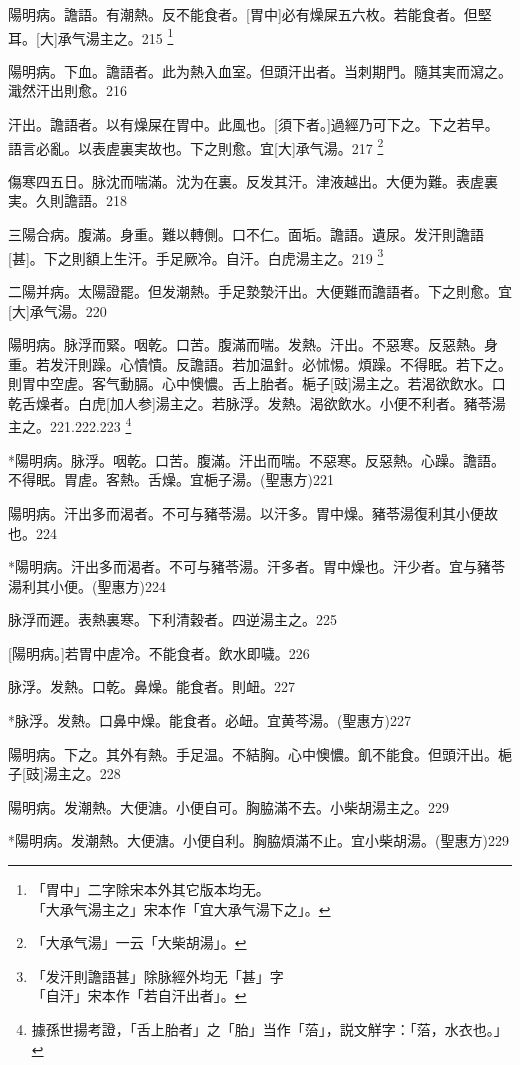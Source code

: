 \documentclass[12pt,twoside,UTF8,b5paper]{ctexbook}
\begin{document}
陽明病。譫語。有潮熱。反不能食者。[胃中]必有燥屎五六枚。若能食者。但堅耳。[大]承气湯主之。215
	\footnote{「胃中」二字除宋本外其它版本均无。\\「大承气湯主之」宋本作「宜大承气湯下之」。}

陽明病。下血。譫語者。此为熱入血室。但頭汗出者。当刺期門。隨其実而瀉之。濈然汗出則愈。216

汗出。譫語者。以有燥屎在胃中。此風也。[須下者。]過經乃可下之。下之若早。語言必亂。以表虗裏実故也。下之則愈。宜[大]承气湯。217
	\footnote{「大承气湯」一云「大柴胡湯」。}

傷寒四五日。脉沈而喘滿。沈为在裏。反发其汗。津液越出。大便为難。表虗裏実。久則譫語。218

三陽合病。腹滿。身重。難以轉側。口不仁。面垢。譫語。遺尿。发汗則譫語[甚]。下之則額上生汗。手足厥冷。自汗。白虎湯主之。219
	\footnote{「发汗則譫語甚」除脉經外均无「甚」字\\「自汗」宋本作「若自汗出者」。}

二陽并病。太陽證罷。但发潮熱。手足漐漐汗出。大便難而譫語者。下之則愈。宜[大]承气湯。220

陽明病。脉浮而緊。咽乾。口苦。腹滿而喘。发熱。汗出。不惡寒。反惡熱。身重。若发汗則躁。心憒憒。反譫語。若加温針。必怵惕。煩躁。不得眠。若下之。則胃中空虗。客气動膈。心中懊憹。舌上胎者。梔子[豉]湯主之。若渴欲飲水。口乾舌燥者。白虎[加人参]湯主之。若脉浮。发熱。渴欲飲水。小便不利者。豬苓湯主之。221.222.223
	\footnote{據孫世揚考證，「舌上胎者」之「胎」当作「菭」，説文觧字：「菭，水衣也。」}

*陽明病。脉浮。咽乾。口苦。腹滿。汗出而喘。不惡寒。反惡熱。心躁。譫語。不得眠。胃虗。客熱。舌燥。宜梔子湯。(聖惠方)221

陽明病。汗出多而渴者。不可与豬苓湯。以汗多。胃中燥。豬苓湯復利其小便故也。224

*陽明病。汗出多而渴者。不可与豬苓湯。汗多者。胃中燥也。汗少者。宜与豬苓湯利其小便。(聖惠方)224

脉浮而遲。表熱裏寒。下利清穀者。四逆湯主之。225

[陽明病。]若胃中虗冷。不能食者。飲水即噦。226

脉浮。发熱。口乾。鼻燥。能食者。則衄。227

*脉浮。发熱。口鼻中燥。能食者。必衄。宜黄芩湯。(聖惠方)227

陽明病。下之。其外有熱。手足温。不結胸。心中懊憹。飢不能食。但頭汗出。梔子[豉]湯主之。228

陽明病。发潮熱。大便溏。小便自可。胸脇滿不去。小柴胡湯主之。229

*陽明病。发潮熱。大便溏。小便自利。胸脇煩滿不止。宜小柴胡湯。(聖惠方)229
\end{document}
